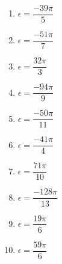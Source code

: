 \documentclass[11pt]{article}
\begin{document}
\begin{exercice}
\begin{multicols}{2}
\begin{enumerate}[itemsep=1em]
	\item \begin{minipage}[t]{\linewidth} $\epsilon=\dfrac{-39\pi}{5}$ \end{minipage}
	\item \begin{minipage}[t]{\linewidth} $\epsilon=\dfrac{-51\pi}{7}$ \end{minipage}
	\item \begin{minipage}[t]{\linewidth} $\epsilon=\dfrac{32\pi}{3}$ \end{minipage}
	\item \begin{minipage}[t]{\linewidth} $\epsilon=\dfrac{-94\pi}{9}$ \end{minipage}
	\item \begin{minipage}[t]{\linewidth} $\epsilon=\dfrac{-50\pi}{11}$ \end{minipage}
	\item \begin{minipage}[t]{\linewidth} $\epsilon=\dfrac{-41\pi}{4}$ \end{minipage}
	\item \begin{minipage}[t]{\linewidth} $\epsilon=\dfrac{71\pi}{10}$ \end{minipage}
	\item \begin{minipage}[t]{\linewidth} $\epsilon=\dfrac{-128\pi}{13}$ \end{minipage}
	\item \begin{minipage}[t]{\linewidth} $\epsilon=\dfrac{19\pi}{6}$ \end{minipage}
	\item \begin{minipage}[t]{\linewidth} $\epsilon=\dfrac{59\pi}{6}$ \end{minipage}
\end{enumerate}
\end{multicols}
\end{exercice}
\end{document}
